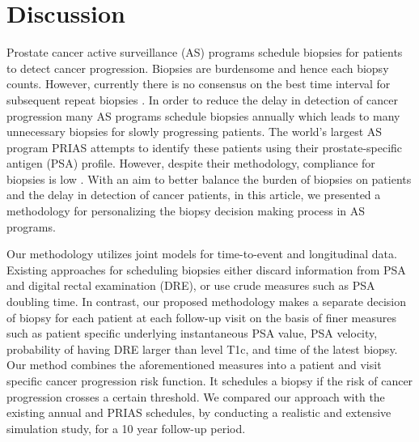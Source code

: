 
\section{Discussion}
\label{sec:discussion}
Prostate cancer active surveillance (AS) programs schedule biopsies for patients to detect cancer progression. Biopsies are burdensome and hence each biopsy counts. However, currently there is no consensus on the best time interval for subsequent repeat biopsies \cite{loeb2014heterogeneity}. In order to reduce the delay in detection of cancer progression many AS programs schedule biopsies annually which leads to many unnecessary biopsies for slowly progressing patients. The world's largest AS program PRIAS attempts to identify these patients using their prostate-specific antigen (PSA) profile. However, despite their methodology, compliance for biopsies is low \citep{bokhorst2015compliance}. With an aim to better balance the burden of biopsies on patients and the delay in detection of cancer patients, in this article, we presented a methodology for personalizing the biopsy decision making process in AS programs.

Our methodology utilizes joint models for time-to-event and longitudinal data. Existing approaches for scheduling biopsies either discard information from PSA and digital rectal examination (DRE), or use crude measures such as PSA doubling time. In contrast, our proposed methodology makes a separate decision of biopsy for each patient at each follow-up visit on the basis of finer measures such as patient specific underlying instantaneous PSA value, PSA velocity, probability of having DRE larger than level T1c, and time of the latest biopsy. Our method combines the aforementioned measures into a patient and visit specific cancer progression risk function. It schedules a biopsy if the risk of cancer progression crosses a certain threshold. We compared our approach with the existing annual and PRIAS schedules, by conducting a realistic and extensive simulation study, for a 10 year follow-up period.

